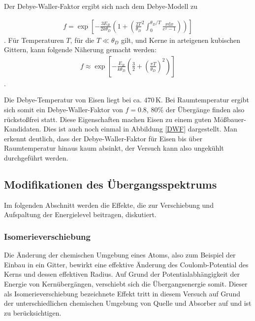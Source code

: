 Der Debye-Waller-Faktor ergibt sich nach dem Debye-Modell zu

\begin{align}
f = \exp\left[ -\frac{3E_R}{2k\theta_D}\left( 1+\left( \frac{2T}{\theta_D}^2 \int_{0}^{\theta_D/T}\frac{x\mathrm{d}x}{e^x-1}\right) \right) \right]
\end{align}.
Für Temperaturen $T$, für die $T \ll \theta_D$ gilt, und Kerne in arteigenen kubischen Gittern, kann folgende Näherung gemacht werden:
\begin{align}
f\approx \exp\left[ -\frac{E_R}{k\theta_D} \left(\frac{3}{2} + \left(\frac{\pi T}{\theta_D}\right)^2 \right) \right]
\end{align}.

Die Debye-Temperatur von Eisen liegt bei ca. $470 \,\mathrm{K}$. Bei Raumtemperatur ergibt sich somit ein Debye-Waller-Faktor von $f=0.8$, 80\% der Übergänge finden also rückstoßfrei statt. Diese Eigenschaften machen Eisen zu einem guten Mößbauer-Kandidaten. Dies ist auch noch einmal in Abbildung \ref{DWF} dargestellt. Man erkennt deutlich, dass der Debye-Waller-Faktor für Eisen bis über Raumtemperatur hinaus kaum absinkt, der Versuch kann also ungekühlt durchgeführt werden.


\subsection{Modifikationen des Übergangsspektrums}

Im folgenden Abschnitt werden die Effekte, die zur Verschiebung und Aufspaltung der Energielevel beitragen, diskutiert.
\subsubsection{Isomerieverschiebung \label{Isomerie}}

Die Änderung der chemischen Umgebung eines Atoms, also zum Beispiel der Einbau in ein Gitter, bewirkt eine effektive Änderung des Coulomb-Potential des Kerns und dessen effektiven Radius. Auf Grund der Potentialabhängigkeit der Energie von Kernübergängen, verschiebt sich die Übergangsenergie somit. Dieser als Isomerieverschiebung bezeichnete Effekt tritt in diesem Versuch auf Grund der unterschiedlichen chemischen Umgebung von Quelle und Absorber auf und ist zu berücksichtigen.



